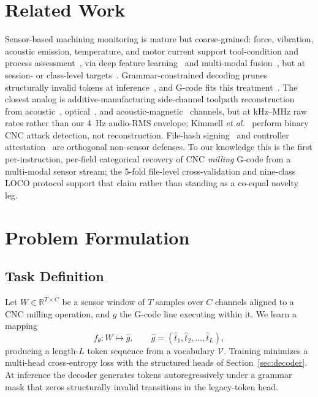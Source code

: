 \documentclass[conference]{IEEEtran}
\newcommand{\etal}{\textit{et al.}}
\begin{document}
\section{Related Work}
\label{sec:related}
\label{sec:related-cnc}\label{sec:related-seq2seq}\label{sec:related-sidechan}\label{sec:related-security}

Sensor-based machining monitoring is mature but coarse-grained: force, vibration, acoustic emission, temperature, and motor current support tool-condition and process assessment~\cite{teti2010advanced,zhu2009wavelet,mohanraj2020tool}, via deep feature learning~\cite{wang2018deep,zhao2019machine} and multi-modal fusion~\cite{lahat2015multimodal,ramachandram2017deep,cao2023crossattention}, but at session- or class-level targets~\cite{tsanousa2022multisensor,stathatos2024cnn,coelho2024anomaly}. Grammar-constrained decoding prunes structurally invalid tokens at inference~\cite{picard,outlines,xgrammar,geng2023gcd}, and G-code fits this treatment~\cite{grammar_paper,gcode_foundational}. The closest analog is additive-manufacturing side-channel toolpath reconstruction from acoustic~\cite{alfaruque2016acoustic,song2016my}, optical~\cite{chattopadhyay2025video}, and acoustic-magnetic~\cite{jamarani2024screg} channels, but at kHz--MHz raw rates rather than our 4~Hz audio-RMS envelope; Kimmell \etal~\cite{kimmell2025cnc} perform binary CNC attack detection, not reconstruction. File-hash signing~\cite{belikovetsky2017drowned} and controller attestation~\cite{zonouz2014plc} are orthogonal non-sensor defenses. To our knowledge this is the first per-instruction, per-field categorical recovery of CNC \emph{milling} G-code from a multi-modal sensor stream; the 5-fold file-level cross-validation and nine-class LOCO protocol support that claim rather than standing as a co-equal novelty leg.\label{sec:related-comparison}

\section{Problem Formulation}
\label{sec:problem}

\subsection{Task Definition}
\label{sec:task}

Let $W \in \mathbb{R}^{T \times C}$ be a sensor window of $T$ samples over $C$ channels aligned to a CNC milling operation, and $g$ the G-code line executing within it. We learn a mapping
\begin{equation*}
  f_\theta: W \mapsto \hat{g}, \qquad \hat{g} = (\hat{t}_1, \hat{t}_2, \dots, \hat{t}_L),
\end{equation*}
producing a length-$L$ token sequence from a vocabulary $\mathcal{V}$. Training minimizes a multi-head cross-entropy loss with the structured heads of Section~\ref{sec:decoder}. At inference the decoder generates tokens autoregressively under a grammar mask that zeros structurally invalid transitions in the legacy-token head.
\end{document}
